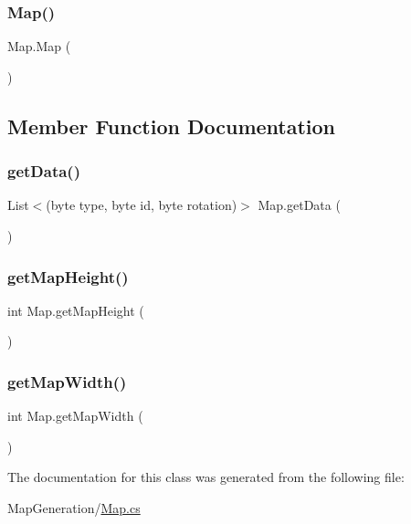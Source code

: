 \subsubsection{\texorpdfstring{Map()}{Map()}\hspace{0.1cm}{\footnotesize\ttfamily [2/2]}}
{\footnotesize\ttfamily Map.\+Map (\begin{DoxyParamCaption}{ }\end{DoxyParamCaption})}



\subsection{Member Function Documentation}
\mbox{\label{class_map_a6acb3dce930b94bf2ebf2828e1321748}} 
\subsubsection{\texorpdfstring{get\+Data()}{getData()}}
{\footnotesize\ttfamily List$<$(byte type, byte id, byte rotation)$>$ Map.\+get\+Data (\begin{DoxyParamCaption}{ }\end{DoxyParamCaption})}

\mbox{\label{class_map_a40c059a8f17911343281c8766d0ec072}} 
\subsubsection{\texorpdfstring{get\+Map\+Height()}{getMapHeight()}}
{\footnotesize\ttfamily int Map.\+get\+Map\+Height (\begin{DoxyParamCaption}{ }\end{DoxyParamCaption})}

\mbox{\label{class_map_a3076f3e98e0f0906f1b33cfe8ed63eea}} 
\subsubsection{\texorpdfstring{get\+Map\+Width()}{getMapWidth()}}
{\footnotesize\ttfamily int Map.\+get\+Map\+Width (\begin{DoxyParamCaption}{ }\end{DoxyParamCaption})}



The documentation for this class was generated from the following file\+:\begin{DoxyCompactItemize}
\item 
Map\+Generation/\mbox{\hyperlink{_map_8cs}{Map.\+cs}}\end{DoxyCompactItemize}
